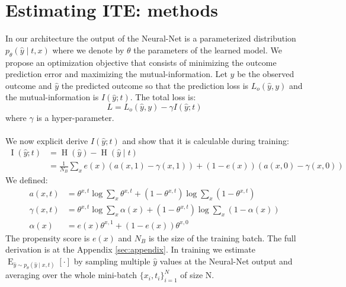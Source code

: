 \documentclass[oneside,12pt]{article}
\begin{document}
\section{Estimating ITE: methods}\label{sec:alg}
In our architecture the output of the Neural-Net is a parameterized distribution $p_\theta(\hat{y} \mid t,x)$ where we denote by $\theta$ the parameters of the learned model. We propose an optimization objective that consists of minimizing the outcome prediction error and maximizing the mutual-information. Let $y$ be the observed outcome and $\hat{y}$ the predicted outcome so that the prediction loss is $L_o(\hat{y}, y)$ and the mutual-information is $I(\hat{y};t)$. The total loss is:
\begin{equation}\label{eq:loss}
    L = L_o(\hat{y}, y) - \gamma I(\hat{y};t)
\end{equation}
where $\gamma$ is a hyper-parameter.\\\\
%
We now explicit derive $I(\hat{y};t)$ and show that it is calculable during training:
%
\begin{equation}
    \begin{split}
        \operatorname{I}(\hat{y}; t) &= \operatorname{H}(\hat{y}) - \operatorname{H}(\hat{y} \mid t)\\
        &= \frac{1}{N_B} \sum_x e(x)\left(a(x,1)-\gamma(x,1)\right) + (1-e(x))\left(a(x,0)-\gamma(x,0)\right)
    \end{split}
\end{equation}
%
We defined:
\begin{equation}
    \begin{split}
        a(x,t) &= \theta^{x,t}\operatorname{log} \sum_x \theta^{x,t} + (1-\theta^{x,t})\operatorname{log} \sum_x (1-\theta^{x,t})\\
        \gamma(x,t) &= \theta^{x,t}\operatorname{log}\sum_x \alpha(x)
        + (1-\theta^{x,t})\operatorname{log}\sum_x (1 - \alpha(x))\\
        \alpha(x) &= e(x)\theta^{x,1} + (1-e(x))\theta^{x,0}
    \end{split}
\end{equation}
%
The propensity score is $e(x)$ and $N_B$ is the size of the training batch. The full derivation is at the Appendix \ref{sec:appendix}. In training we estimate $\operatorname{E}_{\hat{y} \sim p_\theta(\hat{y} \mid x,t)} \left[ \cdot \right]$ by sampling multiple $\hat{y}$ values at the Neural-Net output and averaging over the whole mini-batch $\{x_i,t_i\}_{i=1}^N$ of size N.\\\\
\end{document}

